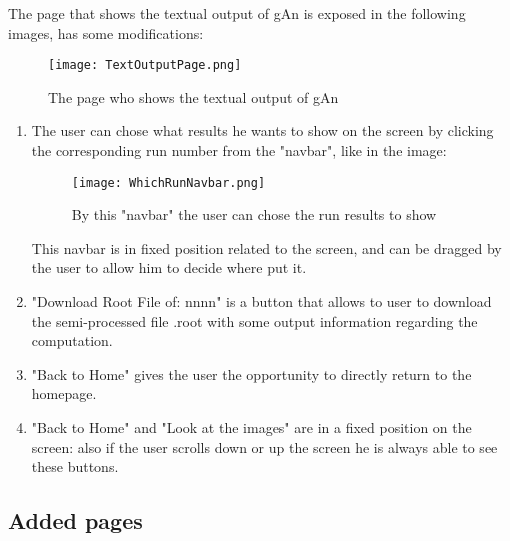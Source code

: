 The page that shows the textual output of gAn is exposed in the following images, has some modifications:

\begin{figure}[H]
\centering
\texttt{[image: TextOutputPage.png]} 
\caption{The page who shows the textual output of gAn}
\end{figure}


\begin{enumerate}
\item The user can chose what results he wants to show on the screen by clicking the corresponding run number from the "navbar", like in the image:

\begin{figure}[H]
\centering
\texttt{[image: WhichRunNavbar.png]} 
\caption{By this "navbar" the user can chose the run results to show}
\end{figure}

This navbar is in fixed position related to the screen, and can be dragged by the user to allow him to decide where put it.

\item "Download Root File of: nnnn" is a button that allows to user to download the semi-processed file .root with some output information regarding the computation.

\item "Back to Home" gives the user the opportunity to directly return to the homepage. 

\item "Back to Home" and "Look at the images" are in a fixed position on the screen: also if the user scrolls down or up the screen he is always able to see these buttons.    

\end{enumerate}

\subsection{Added pages}
